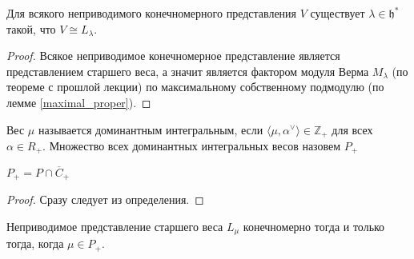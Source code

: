 \documentclass[a4article]{article}
\begin{document}
\begin{corollary}
    Для всякого неприводимого конечномерного представления $V$ существует $\lambda \in \mathfrak{h}^*$ такой, что $V \cong L_{\lambda}$.
\end{corollary}

\begin{proof}
    Всякое неприводимое конечномерное представление является представлением старшего веса, а значит является фактором модуля Верма $M_{\lambda}$ (по теореме с прошлой лекции) по максимальному собственному подмодулю (по лемме \ref{maximal_proper}).
\end{proof}

\begin{definition}
    Вес $\mu$ называется доминантным интегральным, если $\langle \mu, \alpha^{\vee} \rangle \in \mathbb{Z}_+$ для всех $\alpha \in R_+$. Множество всех доминантных интегральных весов назовем $P_+$
\end{definition}
\begin{lemma}
    $P_+ = P \cap \overline{C}_+$
\end{lemma}
\begin{proof}
    Сразу следует из определения.
\end{proof}
\begin{theorem}
\label{finitedim}
    Неприводимое представление старшего веса $L_{\mu}$ конечномерно тогда и только тогда, когда $\mu \in P_+$.
\end{theorem}
\end{document}
